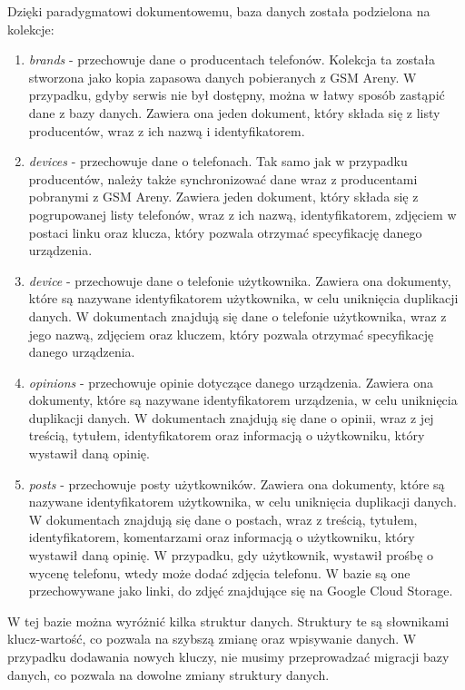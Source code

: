Dzięki paradygmatowi dokumentowemu, baza danych została podzielona na kolekcje:
\begin{enumerate}
    \item \textit{brands} - przechowuje dane o producentach telefonów. Kolekcja ta została stworzona jako kopia zapasowa danych pobieranych z GSM Areny. W przypadku, gdyby serwis nie był dostępny, można w łatwy sposób zastąpić dane z bazy danych. Zawiera ona jeden dokument, który składa się z listy producentów, wraz z ich nazwą i identyfikatorem.
    \item \textit{devices} - przechowuje dane o telefonach. Tak samo jak w przypadku producentów, należy także synchronizować dane wraz z producentami pobranymi z GSM Areny. Zawiera jeden dokument, który składa się z pogrupowanej listy telefonów, wraz z ich nazwą, identyfikatorem, zdjęciem w postaci linku oraz klucza, który pozwala otrzymać specyfikację danego urządzenia.
    \item \textit{device} - przechowuje dane o telefonie użytkownika. Zawiera ona dokumenty, które są nazywane identyfikatorem użytkownika, w celu uniknięcia duplikacji danych. W dokumentach znajdują się dane o telefonie użytkownika, wraz z jego nazwą, zdjęciem oraz kluczem, który pozwala otrzymać specyfikację danego urządzenia.
    \item \textit{opinions} - przechowuje opinie dotyczące danego urządzenia. Zawiera ona dokumenty, które są nazywane identyfikatorem urządzenia, w celu uniknięcia duplikacji danych. W dokumentach znajdują się dane o opinii, wraz z jej treścią, tytułem, identyfikatorem oraz informacją o użytkowniku, który wystawił daną opinię.
    \item \textit{posts} - przechowuje posty użytkowników. Zawiera ona dokumenty, które są nazywane identyfikatorem użytkownika, w celu uniknięcia duplikacji danych. W dokumentach znajdują się dane o postach, wraz z treścią, tytułem, identyfikatorem, komentarzami oraz informacją o użytkowniku, który wystawił daną opinię. W przypadku, gdy użytkownik, wystawił prośbę o wycenę telefonu, wtedy może dodać zdjęcia telefonu. W bazie są one przechowywane jako linki, do zdjęć znajdujące się na Google Cloud Storage.
\end{enumerate}

W tej bazie można wyróżnić kilka struktur danych. Struktury te są słownikami klucz-wartość, co pozwala na szybszą zmianę oraz wpisywanie danych. W przypadku dodawania nowych kluczy, nie musimy przeprowadzać migracji bazy danych, co pozwala na dowolne zmiany struktury danych.


